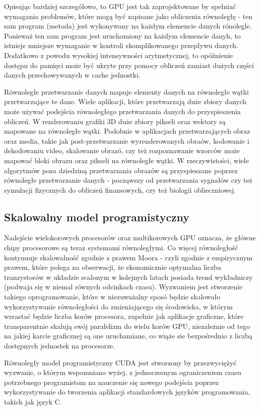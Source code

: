 Opisując bardziej szczegółowo, to GPU jest tak zaprojektowane by spełniać wymagania problemów, które mogą być zapisane jako obliczenia równoległę - ten sam program (metoda) jest wykonywany na każdym elemencie danych rónolegle. Ponieważ ten sam program jest uruchomiony na każdym elemencie danyh, to istnieje mniejsze wymaganie w kontroli skomplikowanego przepływu danych. Dodatkowo z powodu wysokiej intensywności arytmetycznej, to opóźnienie dostępu do pamięci może być ukryte przy pomocy obliczeń zamiast dużych części danych przechowywanych w cache jednostki.

Równoległe przetwarzanie danych mapuje elementy danych na równoległe wątki przetwarzające te dane. Wiele aplikacji, które przetwarzają duże zbiory danych może używać podejścia równoległego przetwarzania danych do przyspieszenia obliczeń. W renderowaniu grafiki 3D duże zbiory pikseli oraz wektory są mapowane na równoległe wątki. Podobnie w aplikacjach przetwarzających obraz oraz media, takie jak post-przetwarzanie wyrenderowanych obraów, kodowanie i  dekodowaniu video, skalowanie obrazó, czy też rozpoznawanie wzorców może mapować bloki obrazu oraz pikseli na równoległe wątki. W rzeczywistości, wiele algorytmów poza dziedziną przetwarzania obrazów są przyspieszane poprzez równoległe przetwarzanie danych - począwszy od przetwarzania sygnałów czy też symulacji fizycznych do obliczeń finansowych, czy też biologii oblieczniowej.

\subsection{Skalowalny model programistyczny}
Nadejście wielokorowych procesorów oraz multikorowych GPU oznacza, że główne chipy procesorowe są teraz systemami równoległymi. Co więcej równoległość kontynuuje skalowalność zgodnie z prawem Moora - czyli zgodnie z empirycznym prawem, które polega na obserwacji, że ekonomicznie optymalna liczba tranzystorów w układzie scalonym w kolejnych latach posiada trend wykładniczy (podwaja się w niemal równych odcinkach czasu). Wyzwaniem jest stworzenie takiego oprogramowanie, które w niezuważalny sposó będzie skalowało wykorzystywanie równoległości do zmieniającego się środowiska, w którym wzrastać będzie liczba korów procesora, zupełnie jak aplikacje graficzne, które transparentnie skalują swój paralelizm do wielu korów GPU, niezależnie od tego na jakiej karcie graficznej są one uruchamiane, co wiąże sie bezpośrednio z liczbą dostępnych jednostek na procesorze.

Równoległy model programistyczny CUDA jest stworzony by przezwyciężyć wyzwanie, o którym wspomniano wyżej, z jednoczesnym ograniczeniem czasu potrzebnego programistom na nauczenie się nowego podejścia poprzez wykorzystywanie do tworzenia aplikacji standardowych języków programowania, takich jak język C.

